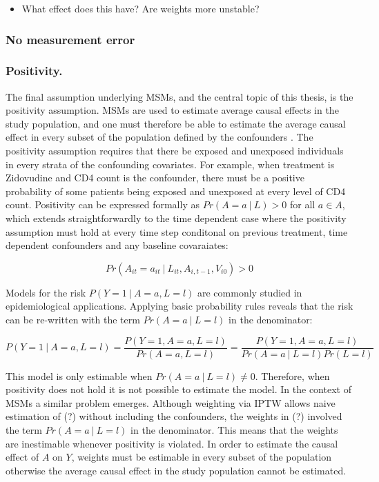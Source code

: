 \documentclass[11pt]{article}
\providecommand{\tightlist}{%
      \setlength{\itemsep}{0pt}\setlength{\parskip}{0pt}}
\begin{document}
\begin{itemize}
\tightlist
\item
  What effect does this have? Are weights more unstable?
\end{itemize}

\subsubsection{No measurement error}\label{no-measurement-error}

\subsubsection{Positivity.}\label{positivity.}

The final assumption underlying MSMs, and the central topic of this
thesis, is the positivity assumption. MSMs are used to estimate average
causal effects in the study population, and one must therefore be able
to estimate the average causal effect in every subset of the population
defined by the confounders \citet{Cole2008}. The positivity assumption
requires that there be exposed and unexposed individuals in every strata
of the confounding covariates. For example, when treatment is Zidovudine
and CD4 count is the confounder, there must be a positive probability of
some patients being exposed and unexposed at every level of CD4 count.
Positivity can be expressed formally as \(Pr(A=a\ |\ L) > 0\) for all
\(a \in A\), which extends straightforwardly to the time dependent case
where the positivity assumption must hold at every time step conditonal
on previous treatment, time dependent confounders and any baseline
covaraiates:

\[Pr(A_{it}=a_{it}\ |\ L_{it}, A_{i, t-1}, V_{i0}) > 0\]

Models for the risk \(P(Y=1\ |\ A=a, L=l)\) are commonly studied in
epidemiological applications. Applying basic probability rules reveals
that the risk can be re-written with the term \(Pr(A=a\ |\ L=l)\) in the
denominator:

\[P(Y=1\ |\ A=a, L=l) = \frac{P(Y=1, A=a, L=l)}{Pr(A=a, L=l)} = \frac{P(Y=1, A=a, L=l)}{Pr(A=a\ |\ L=l)Pr(L=l)}\]

This model is only estimable when \(Pr(A=a\ |\ L=l) \neq 0\). Therefore,
when positivity does not hold it is not possible to estimate the model.
In the context of MSMs a similar problem emerges. Although weighting via
IPTW allows naive estimation of (?) without including the confounders,
the weights in (?) involved the term \(Pr(A=a\ |\ L=l)\) in the
denominator. This means that the weights are inestimable whenever
positivity is violated. In order to estimate the causal effect of \(A\)
on \(Y\), weights must be estimable in every subset of the population
otherwise the average causal effect in the study population cannot be
estimated. \linebreak
\end{document}
